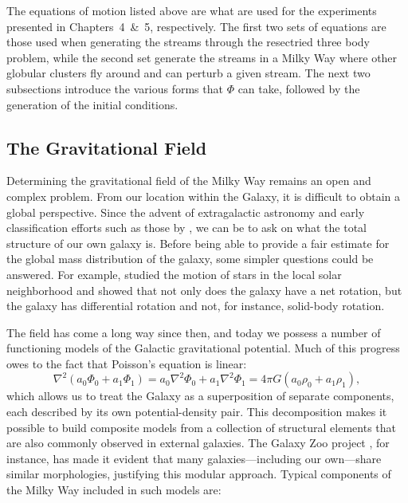         The equations of motion listed above are what are used for the experiments presented in Chapters~4~\&~5, respectively. The first two sets of equations are those used when generating the streams through the resectried three body problem, while the second set generate the streams in a Milky Way where other globular clusters fly around and can perturb a given stream. The next two subsections introduce the various forms that $\Phi$ can take, followed by the generation of the initial conditions. 


    \subsection{The Gravitational Field} \label{subsec:gravfield}

        Determining the gravitational field of the Milky Way remains an open and complex problem. From our location within the Galaxy, it is difficult to obtain a global perspective. Since the advent of extragalactic astronomy and early classification efforts such as those by \citet{1926ApJ....64..321H}, we can be to ask on what the total structure of our own galaxy is. Before being able to provide a fair estimate for the global mass distribution of the galaxy, some simpler questions could be answered. For example, \citet{1927BAN.....4...91O} studied the motion of stars in the local solar neighborhood and showed that not only does the galaxy have a net rotation, but the galaxy has differential rotation and not, for instance, solid-body rotation. 

        The field has come a long way since then, and today we possess a number of functioning models of the Galactic gravitational potential. Much of this progress owes to the fact that Poisson's equation is linear:
        \begin{equation}\label{eq:linear_poisson}
            \nabla^2 \left(a_0\Phi_0 + a_1\Phi_1 \right) = a_0 \nabla^2 \Phi_0 + a_1 \nabla^2 \Phi_1 = 4\pi G \left(a_0\rho_0 +a_1\rho_1\right),
        \end{equation}
        which allows us to treat the Galaxy as a superposition of separate components, each described by its own potential-density pair. This decomposition makes it possible to build composite models from a collection of structural elements that are also commonly observed in external galaxies. The Galaxy Zoo project \citep{2008MNRAS.389.1179L}, for instance, has made it evident that many galaxies—including our own—share similar morphologies, justifying this modular approach. Typical components of the Milky Way included in such models are:

